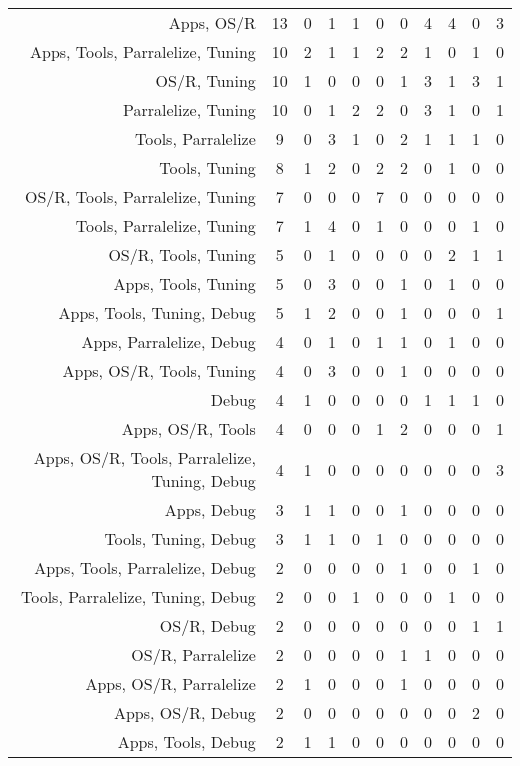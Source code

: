 {\begin{landscape}
\begin{longtable}[htb]{r|c|c|c|c|c|c|c|c|c|c}
{Apps, OS/R} & 13 & 0 & 1 & 1 & 0 & 0 & 4 & 4 & 0 & 3 \\%
{Apps, Tools, Parralelize, Tuning} & 10 & 2 & 1 & 1 & 2 & 2 & 1 & 0 & 1 & 0 \\%
{OS/R, Tuning} & 10 & 1 & 0 & 0 & 0 & 1 & 3 & 1 & 3 & 1 \\%
{Parralelize, Tuning} & 10 & 0 & 1 & 2 & 2 & 0 & 3 & 1 & 0 & 1 \\%
{Tools, Parralelize} & 9 & 0 & 3 & 1 & 0 & 2 & 1 & 1 & 1 & 0 \\%
{Tools, Tuning} & 8 & 1 & 2 & 0 & 2 & 2 & 0 & 1 & 0 & 0 \\%
{OS/R, Tools, Parralelize, Tuning} & 7 & 0 & 0 & 0 & 7 & 0 & 0 & 0 & 0 & 0 \\%
{Tools, Parralelize, Tuning} & 7 & 1 & 4 & 0 & 1 & 0 & 0 & 0 & 1 & 0 \\%
{OS/R, Tools, Tuning} & 5 & 0 & 1 & 0 & 0 & 0 & 0 & 2 & 1 & 1 \\%
{Apps, Tools, Tuning} & 5 & 0 & 3 & 0 & 0 & 1 & 0 & 1 & 0 & 0 \\%
{Apps, Tools, Tuning, Debug} & 5 & 1 & 2 & 0 & 0 & 1 & 0 & 0 & 0 & 1 \\%
{Apps, Parralelize, Debug} & 4 & 0 & 1 & 0 & 1 & 1 & 0 & 1 & 0 & 0 \\%
{Apps, OS/R, Tools, Tuning} & 4 & 0 & 3 & 0 & 0 & 1 & 0 & 0 & 0 & 0 \\%
{Debug} & 4 & 1 & 0 & 0 & 0 & 0 & 1 & 1 & 1 & 0 \\%
{Apps, OS/R, Tools} & 4 & 0 & 0 & 0 & 1 & 2 & 0 & 0 & 0 & 1 \\%
{Apps, OS/R, Tools, Parralelize, Tuning, Debug} & 4 & 1 & 0 & 0 & 0 & 0 & 0 & 0 & 0 & 3 \\%
{Apps, Debug} & 3 & 1 & 1 & 0 & 0 & 1 & 0 & 0 & 0 & 0 \\%
{Tools, Tuning, Debug} & 3 & 1 & 1 & 0 & 1 & 0 & 0 & 0 & 0 & 0 \\%
{Apps, Tools, Parralelize, Debug} & 2 & 0 & 0 & 0 & 0 & 1 & 0 & 0 & 1 & 0 \\%
{Tools, Parralelize, Tuning, Debug} & 2 & 0 & 0 & 1 & 0 & 0 & 0 & 1 & 0 & 0 \\%
{OS/R, Debug} & 2 & 0 & 0 & 0 & 0 & 0 & 0 & 0 & 1 & 1 \\%
{OS/R, Parralelize} & 2 & 0 & 0 & 0 & 0 & 1 & 1 & 0 & 0 & 0 \\%
{Apps, OS/R, Parralelize} & 2 & 1 & 0 & 0 & 0 & 1 & 0 & 0 & 0 & 0 \\%
{Apps, OS/R, Debug} & 2 & 0 & 0 & 0 & 0 & 0 & 0 & 0 & 2 & 0 \\%
{Apps, Tools, Debug} & 2 & 1 & 1 & 0 & 0 & 0 & 0 & 0 & 0 & 0 \\%

\end{longtable}
\end{landscape}}
